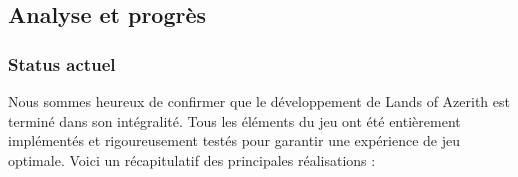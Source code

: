 

\subsection{Analyse et progrès}

\subsubsection*{Status actuel}


Nous sommes heureux de confirmer que le développement de Lands of Azerith est terminé dans son intégralité. Tous les éléments du jeu ont été entièrement implémentés et rigoureusement testés pour garantir une expérience de jeu optimale. Voici un récapitulatif des principales réalisations :
\\

